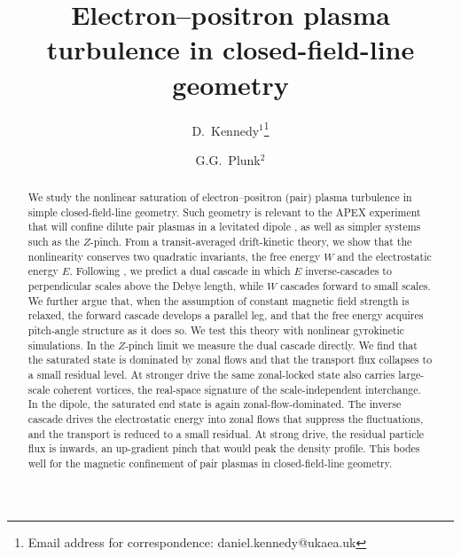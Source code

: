 \documentclass{jpp}
\title{Electron--positron plasma turbulence in closed-field-line geometry}
\author{D.~Kennedy$^{1}$\thanks{Email address for correspondence: daniel.kennedy@ukaea.uk}
  \and G.G.~Plunk$^{2}$}
\affiliation{$^{1}$UKAEA (United Kingdom Atomic Energy Authority), Culham Campus, Abingdon, Oxfordshire, OX14 3DB, UK\\
$^{2}$Max-Planck-Institut f\"ur Plasmaphysik, Greifswald, Germany}
\begin{document}
\maketitle

\begin{abstract}
We study the nonlinear saturation of electron--positron (pair) plasma turbulence in simple closed-field-line geometry. Such geometry is relevant to the APEX experiment that will confine dilute pair plasmas in a levitated dipole \citep{Stoneking2020}, as well as simpler systems such as the $Z$-pinch. From a transit-averaged drift-kinetic theory, we show that the nonlinearity conserves two quadratic invariants, the free energy $W$ and the electrostatic energy $E$. Following \citet{Fjortoft1953}, we predict a dual cascade in which $E$ inverse-cascades to perpendicular scales above the Debye length, while $W$ cascades forward to small scales. We further argue that, when the assumption of constant magnetic field strength is relaxed, the forward cascade develops a parallel leg, and that the free energy acquires pitch-angle structure as it does so. We test this theory with nonlinear gyrokinetic simulations. In the $Z$-pinch limit we measure the dual cascade directly. We find that the saturated state is dominated by zonal flows and that the transport flux collapses to a small residual level. At stronger drive the same zonal-locked state also carries large-scale coherent vortices, the real-space signature of the scale-independent interchange. In the dipole, the saturated end state is again zonal-flow-dominated. The inverse cascade drives the electrostatic energy into zonal flows that suppress the fluctuations, and the transport is reduced to a small residual. At strong drive, the residual particle flux is inwards, an up-gradient pinch that would peak the density profile. This bodes well for the magnetic confinement of pair plasmas in closed-field-line geometry.
\end{abstract}
\end{document}
